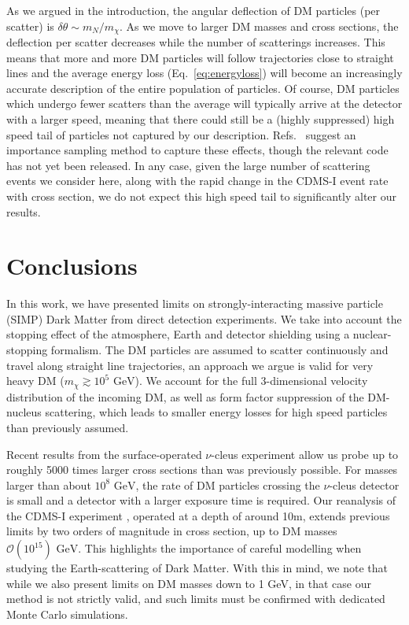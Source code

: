 \documentclass[prd,twocolumn,showpacs,nofootinbib,aps]{revtex4-1}
\begin{document}
As we argued in the introduction, the  angular deflection of DM particles (per scatter) is $\delta \theta \sim m_N/m_\chi$. As we move to larger DM masses and cross sections, the deflection per scatter decreases while the number of scatterings increases. This means that more and more DM particles will follow trajectories close to straight lines and the average energy loss (Eq.~\eqref{eq:energyloss}) will become an increasingly accurate description of the entire population of particles. Of course, DM particles which undergo fewer scatters than the average will typically arrive at the detector with a larger speed, meaning that there could still be a (highly suppressed) high speed tail of particles not captured by our description. Refs.~ \cite{Mahdawi:2017cxz,Mahdawi:2017utm} suggest an importance sampling method to capture these effects, though the relevant code has not yet been released. In any case, given the large number of scattering events we consider here, along with the rapid change in the CDMS-I event rate with cross section, we do not expect this high speed tail to significantly alter our results.

\section{Conclusions}

In this work, we have presented limits on strongly-interacting massive particle (SIMP) Dark Matter from direct detection experiments. We take into account the stopping effect of the atmosphere, Earth and detector shielding using a nuclear-stopping formalism. The DM particles are assumed to scatter continuously and travel along straight line trajectories, an approach we argue is valid for very heavy DM ($m_\chi \gtrsim 10^5 \,\,\mathrm{GeV}$). We account for the full 3-dimensional velocity distribution of the incoming DM, as well as form factor suppression of the DM-nucleus scattering, which leads to smaller energy losses for high speed particles than previously assumed. 

Recent results from the surface-operated $\nu$-cleus experiment \cite{Angloher:2017sxg} allow us probe up to roughly 5000 times larger cross sections than was previously possible. For masses larger than about $10^{8}\,\,\mathrm{GeV}$, the rate of DM particles crossing the $\nu$-cleus detector is small and a detector with a larger exposure time is required. Our reanalysis of the CDMS-I experiment \cite{Abusaidi:2000wg,Abrams:2002nb}, operated at a depth of around 10m, extends previous limits \cite{Albuquerque:2003ei} by two orders of magnitude in cross section, up to DM masses $\mathcal{O}(10^{15})\,\,\mathrm{GeV}$. This highlights the importance of careful modelling when studying the Earth-scattering of Dark Matter. With this in mind, we note that while we also present limits on DM masses down to 1 GeV, in that case our method is not strictly valid, and such limits must be confirmed with dedicated Monte Carlo simulations. 
\end{document}
